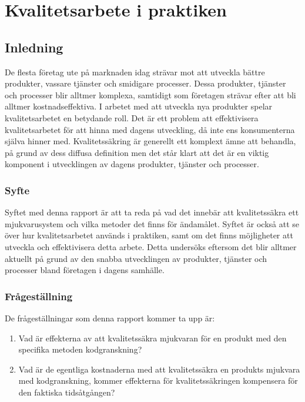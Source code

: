 \chapter{Kvalitetsarbete i praktiken}
\label{cha:indiv-report-wallstrom}

\section{Inledning}
\label{sec:introduction-wallstrom}

De flesta företag ute på marknaden idag strävar mot att utveckla bättre produkter, vassare tjänster och smidigare processer. Dessa produkter, tjänster och processer blir alltmer komplexa, samtidigt som företagen strävar efter att bli alltmer kostnadseffektiva. I arbetet med att utveckla nya produkter spelar kvalitetsarbetet en betydande roll. Det är ett problem att effektivisera kvalitetsarbetet för att hinna med dagens utveckling, då inte ens konsumenterna själva hinner med. Kvalitetssäkring är generellt ett komplext ämne att behandla, på grund av dess diffusa definition men det står klart att det är en viktig komponent i utvecklingen av dagens produkter, tjänster och processer.

\subsection{Syfte}
\label{sec:purpose-wallstrom}

Syftet med denna rapport är att ta reda på vad det innebär att kvalitetssäkra ett mjukvarusystem och vilka metoder det finns för ändamålet. Syftet är också att se över hur kvalitetsarbetet används i praktiken, samt om det finns möjligheter att utveckla och effektivisera detta arbete. Detta undersöks eftersom det blir alltmer aktuellt på grund av den snabba utvecklingen av produkter, tjänster och processer bland företagen i dagens samhälle.

\subsection{Frågeställning}
\label{sec:issue-wallstrom}

De frågeställningar som denna rapport kommer ta upp är:

\begin{enumerate}
	\item Vad är effekterna av att kvalitetssäkra mjukvaran för en produkt med den specifika metoden kodgranskning?
	\item Vad är de egentliga kostnaderna med att kvalitetssäkra en produkts mjukvara med kodgranskning, kommer effekterna för kvalitetssäkringen kompensera för den faktiska tidsåtgången?
\end{enumerate}

